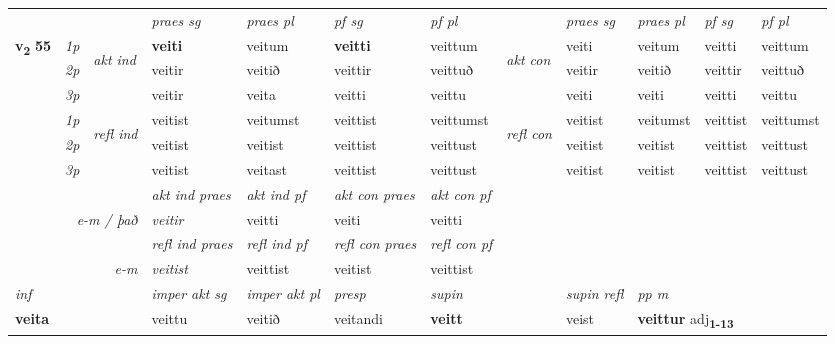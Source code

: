 \begin{longtable}[l]{X>{\footnotesize\itshape}llXXXXlXXXX}
 & &   & \textit{praes sg}  & \textit{praes pl}    & \textit{ pf sg} & \textit{pf pl} & & \textit{praes sg}  & \textit{praes pl}    & \textit{pf sg} & \textit{pf pl }  \\ \cmidrule{4-7} \cmidrule{9-12}
 \multirow{2}{*}{{{\textbf{v{\textsubscript{2}}} \Large{\textbf{55}}}}}  & 1p & \multirow{3}{*}{\begin{turn}{90}\textit{akt ind}\end{turn}} & \textbf{veiti} & veitum & \textbf{veitti} & veittum & \multirow{3}{*}{\begin{turn}{90}\textit{akt con}\end{turn}} &veiti & veitum & veitti & veittum\\*
 & 2p &  &  veitir  & veitið & veittir & veittuð & & veitir & veitið & veittir & veittuð \\*
 & 3p &  & veitir & veita & veitti & veittu & & veiti & veiti& veitti & veittu \\*
\cmidrule{4-7} \cmidrule{9-12}
 & 1p & \multirow{3}{*}{\begin{turn}{90}\textit{refl ind}\end{turn}}  & veitist & veitumst & veittist & veittumst & \multirow{3}{*}{\begin{turn}{90}\textit{refl con}\end{turn}}  &veitist & veitumst & veittist & veittumst \\*
 & 2p &  & veitist & veitist & veittist & veittust & &veitist & veitist & veittist & veittust \\*
 & 3p  & & veitist & veitast & veittist & veittust & & veitist & veitist& veittist & veittust \\*
\cmidrule{4-7} \cmidrule{9-12}

   && &  \textit{akt ind praes} & \textit{akt ind pf} & \textit{akt con praes} & \textit{akt con pf} \\*
\multicolumn{3}{r}{\textit{e-m / það}} & veitir & veitti & veiti & veitti \\*

\cmidrule{4-7}
 & && \textit{refl ind praes} & \textit{refl ind pf} & \textit{refl con praes} & \textit{refl con pf} \\*
\multicolumn{3}{r}{\textit{e-m}}& veitist & veittist & veitist & veittist \\*

\cmidrule{4-7}
   {\textit{inf}} & &  & \textit{imper akt sg} & \textit{imper akt pl}   & \textit{presp} & \textit{supin} && \textit{supin refl} & \textit{pp m} \\*
  {\textbf{veita}} & && veittu  & veitið   & veitandi &  \textbf{veitt} && veist & \multicolumn{2}{l}{\textbf{veittur} adj\textbf{\textsubscript{1-13}}} \\*


\end{longtable}
